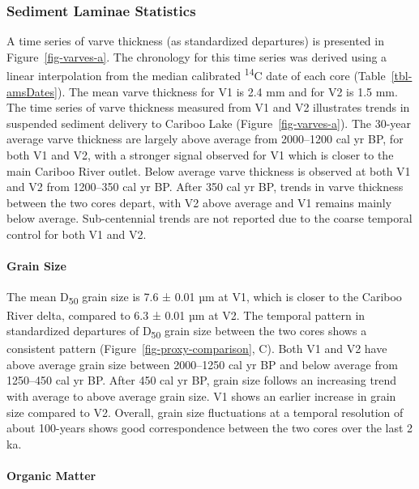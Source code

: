 \documentclass[
  letterpaper,
  DIV=11,
  numbers=noendperiod]{scrartcl}
\let\oldparagraph\paragraph
\renewcommand{\paragraph}[1]{\oldparagraph{#1}\mbox{}}
\begin{document}
\hypertarget{sediment-laminae-statistics}{%
\subsubsection{Sediment Laminae
Statistics}\label{sediment-laminae-statistics}}

A time series of varve thickness (as standardized departures) is
presented in Figure~\ref{fig-varves-a}. The chronology for this time
series was derived using a linear interpolation from the median
calibrated \textsuperscript{14}C date of each core
(Table~\ref{tbl-amsDates}). The mean varve thickness for V1 is 2.4 mm
and for V2 is 1.5 mm. The time series of varve thickness measured from
V1 and V2 illustrates trends in suspended sediment delivery to Cariboo
Lake (Figure~\ref{fig-varves-a}). The 30-year average varve thickness
are largely above average from 2000--1200 cal yr BP, for both V1 and V2,
with a stronger signal observed for V1 which is closer to the main
Cariboo River outlet. Below average varve thickness is observed at both
V1 and V2 from 1200--350 cal yr BP. After 350 cal yr BP, trends in varve
thickness between the two cores depart, with V2 above average and V1
remains mainly below average. Sub-centennial trends are not reported due
to the coarse temporal control for both V1 and V2.

\hypertarget{grain-size}{%
\paragraph{Grain Size}\label{grain-size}}

The mean D\textsubscript{50} grain size is 7.6 ± 0.01 µm at V1, which is
closer to the Cariboo River delta, compared to 6.3 ± 0.01 µm at V2. The
temporal pattern in standardized departures of D\textsubscript{50} grain
size between the two cores shows a consistent pattern
(Figure~\ref{fig-proxy-comparison}, C). Both V1 and V2 have above
average grain size between 2000--1250 cal yr BP and below average from
1250--450 cal yr BP. After 450 cal yr BP, grain size follows an
increasing trend with average to above average grain size. V1 shows an
earlier increase in grain size compared to V2. Overall, grain size
fluctuations at a temporal resolution of about 100-years shows good
correspondence between the two cores over the last 2 ka.

\hypertarget{organic-matter}{%
\paragraph{Organic Matter}\label{organic-matter}}
\end{document}
